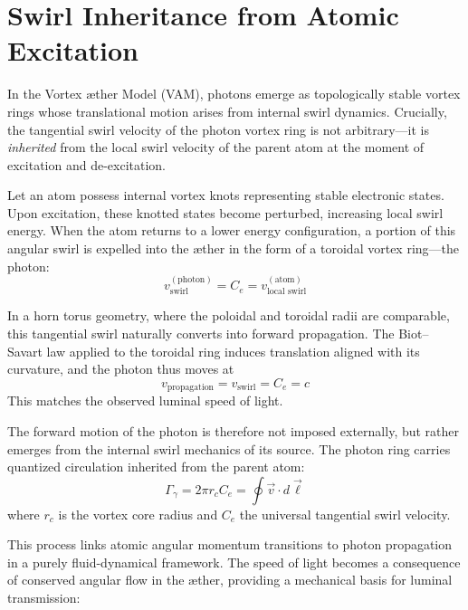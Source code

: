 \section{Swirl Inheritance from Atomic Excitation}\label{sec:swirl-inheritance}

        In the Vortex \ae ther Model (VAM), photons emerge as topologically stable vortex rings whose translational motion arises from internal swirl dynamics. Crucially, the tangential swirl velocity of the photon vortex ring is not arbitrary—it is \emph{inherited} from the local swirl velocity of the parent atom at the moment of excitation and de-excitation.

        Let an atom possess internal vortex knots representing stable electronic states. Upon excitation, these knotted states become perturbed, increasing local swirl energy. When the atom returns to a lower energy configuration, a portion of this angular swirl is expelled into the \ae ther in the form of a toroidal vortex ring—the photon:
        \begin{equation}
            v_{\text{swirl}}^{(\text{photon})} = C_e = v_{\text{local swirl}}^{(\text{atom})}
        \end{equation}

        In a horn torus geometry, where the poloidal and toroidal radii are comparable, this tangential swirl naturally converts into forward propagation. The Biot–Savart law applied to the toroidal ring induces translation aligned with its curvature, and the photon thus moves at
        \begin{equation}
            v_{\text{propagation}} = v_{\text{swirl}} = C_e = c
        \end{equation}
        This matches the observed luminal speed of light.

        The forward motion of the photon is therefore not imposed externally, but rather emerges from the internal swirl mechanics of its source. The photon ring carries quantized circulation inherited from the parent atom:
        \begin{equation}
            \Gamma_\gamma = 2\pi r_c C_e = \oint \vec{v} \cdot d\vec{\ell}
        \end{equation}
        where $r_c$ is the vortex core radius and $C_e$ the universal tangential swirl velocity.

        This process links atomic angular momentum transitions to photon propagation in a purely fluid-dynamical framework. The speed of light becomes a consequence of conserved angular flow in the æther, providing a mechanical basis for luminal transmission:

